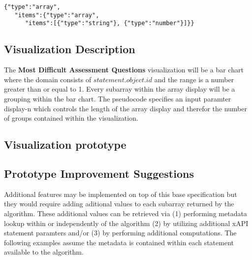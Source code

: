 \documentclass{article}
\begin{document}
\begin{lstlisting}[style=json]
{"type":"array",
   "items":{"type":"array",
      "items":[{"type":"string"}, {"type":"number"}]}}
\end{lstlisting}

\subsection{Visualization Description}
The \textbf{Most Difficult Assessment Questions} visualization will be
a bar chart where the domain consists of $statement.object.id$ and the
range is a number greater than or equal to 1. Every subarray within
the array display will be a grouping within the bar chart. The
pseudocode specifies an input paramter display-n which controls the
length of the array display and therefor the number of groups contained within
the visualization.


\subsection{Visualization prototype}



\subsection{Prototype Improvement Suggestions}
Additional features may be implemented on top of this base
specification but they would require adding aditional values to each
subarray returned by the algorithm. These additional values can be
retrieved via (1) performing metadata lookup within or independently of the
algorithm (2) by utilizing additional xAPI statement paramters and/or (3) by
performing additional computations. The following examples assume the
metadata is contained within each statement available to the algorithm.
\end{document}
